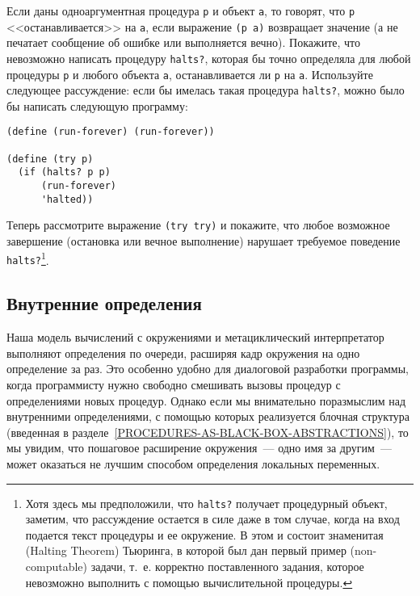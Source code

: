 \begin{exercise}{4.15}%
\label{EX4.15}%
Если даны одноаргументная процедура {\tt p} и
объект {\tt a}, то говорят, что {\tt p}
<<останавливается>> на {\tt a}, если выражение {\tt (p
a)} возвращает значение (а не печатает сообщение об ошибке или
выполняется вечно).  Покажите, что невозможно написать процедуру
{\tt halts?}, которая бы точно определяла для любой процедуры
{\tt p} и любого объекта {\tt a}, останавливается ли
{\tt p} на {\tt a}.  Используйте следующее рассуждение:
если бы имелась такая процедура {\tt halts?}, можно было бы
написать следующую программу:

\begin{Verbatim}[fontsize=\small]
(define (run-forever) (run-forever))

(define (try p)
  (if (halts? p p)
      (run-forever)
      'halted))
\end{Verbatim}
Теперь рассмотрите выражение {\tt (try try)} и покажите, что
любое возможное завершение (остановка или вечное выполнение) нарушает
требуемое поведение {\tt halts?}\footnote{Хотя здесь мы предположили, что
{\tt halts?} получает процедурный объект, заметим, что
рассуждение остается в силе даже в том случае, когда на вход подается текст
процедуры и ее окружение.  В этом и состоит знаменитая  (Halting Theorem) 
Тьюринга, в которой 
был дан первый пример 
 (non-computable) задачи, т.~е. корректно
поставленного задания, которое невозможно выполнить с помощью
вычислительной процедуры.}.
\end{exercise}

\subsection{Внутренние определения}
\label{INTERNAL-DEFINITIONS-CH4}%

Наша модель вычислений с окружениями и метациклический
интерпретатор выполняют определения по очереди, расширяя кадр
окружения на одно определение за раз.  Это особенно удобно для
диалоговой разработки программы, когда программисту нужно свободно
смешивать вызовы процедур с определениями новых процедур.  Однако
если мы внимательно поразмыслим над 
внутренними определениями, с помощью которых реализуется
блочная структура (введенная в
разделе~\ref{PROCEDURES-AS-BLACK-BOX-ABSTRACTIONS}), 
то мы увидим, что
пошаговое расширение окружения~--- одно имя за другим~--- может оказаться не
лучшим способом определения локальных переменных.

